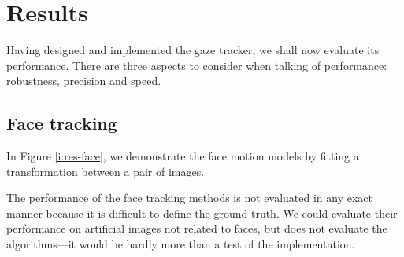 \chapter{Results}
\label{s:results}
Having designed and implemented the gaze tracker, we shall now evaluate its performance.
There are three aspects to consider when talking of performance: robustness, precision and speed.

\section{Face tracking}
In Figure \ref{i:res-face}, we demonstrate the face motion models by fitting a transformation between a pair of images.

The performance of the face tracking methods is not evaluated in any exact manner because it is difficult to define the ground truth.
We could evaluate their performance on artificial images not related to faces, but does not evaluate the algorithms---it would be hardly more than a test of the implementation.

